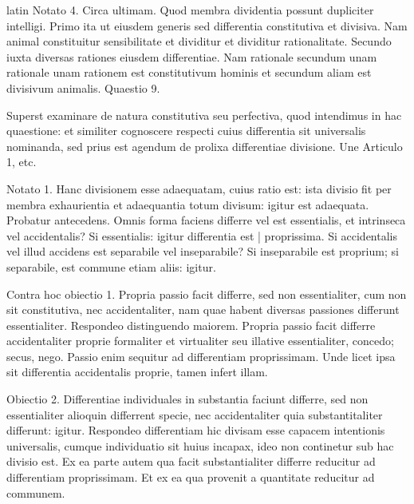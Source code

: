 \begin{otherlanguage*}{latin}
\pstart
Notato 4. Circa ultimam. Quod membra dividentia possunt dupliciter intelligi. Primo ita ut eiusdem generis sed differentia constitutiva et divisiva. Nam animal constituitur sensibilitate et dividitur et dividitur rationalitate. Secundo iuxta diversas rationes eiusdem differentiae. Nam rationale secundum unam rationale unam rationem est constitutivum hominis et secundum aliam est divisivum animalis. Quaestio 9. 
\pend

\pstart
{}
\pend

\pstart
Superst examinare de natura constitutiva seu perfectiva, quod intendimus in hac quaestione:
et similiter cognoscere respecti cuius differentia sit universalis nominanda, sed prius est agendum de prolixa differentiae divisione. Une Articulo 1, etc. 
\pend

\pstart
{}
\pend

\pstart
Notato 1. Hanc divisionem esse adaequatam, cuius ratio est:
ista divisio fit per membra exhaurientia et adaequantia totum divisum:
igitur est adaequata. Probatur antecedens. Omnis forma faciens differre vel est essentialis, et intrinseca vel accidentalis? Si essentialis:
igitur differentia est \textnormal{|} proprissima. Si accidentalis vel illud accidens est separabile vel inseparabile? Si inseparabile est proprium; si separabile, est commune etiam aliis:
igitur. 
\pend

\pstart
Contra hoc obiectio 1. Propria passio facit differre, sed non essentialiter, cum non sit constitutiva, nec accidentaliter, nam quae habent diversas passiones differunt essentialiter. Respondeo distinguendo maiorem. Propria passio facit differre accidentaliter proprie formaliter et virtualiter seu illative essentialiter, concedo; secus, nego. Passio enim sequitur ad differentiam proprissimam. Unde licet ipsa sit differentia accidentalis proprie, tamen infert illam. 
\pend

\pstart
Obiectio 2. Differentiae individuales in substantia faciunt differre, sed non essentialiter alioquin differrent specie, nec accidentaliter quia substantitaliter differunt:
igitur. Respondeo differentiam hic divisam esse capacem intentionis universalis, cumque individuatio sit huius incapax, ideo non continetur sub hac divisio est. Ex ea parte autem qua facit substantialiter differre reducitur ad differentiam proprissimam. Et ex ea qua provenit a quantitate reducitur ad communem. 
\pend


\end{otherlanguage*}
